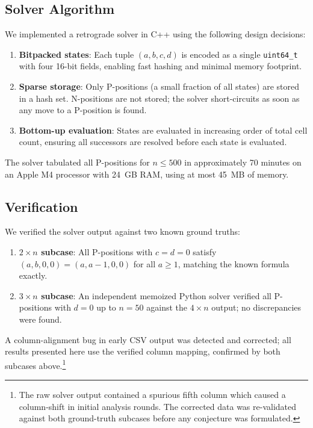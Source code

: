 \documentclass[12pt]{article}
\begin{document}
\subsection{Solver Algorithm}

We implemented a retrograde solver in C++ using the following design
decisions:
\begin{enumerate}
  \item \textbf{Bitpacked states}: Each tuple $(a,b,c,d)$ is encoded
        as a single \texttt{uint64\_t} with four 16-bit fields, enabling
        fast hashing and minimal memory footprint.
  \item \textbf{Sparse storage}: Only P-positions (a small fraction of
        all states) are stored in a hash set. N-positions are not stored;
        the solver short-circuits as soon as any move to a P-position
        is found.
  \item \textbf{Bottom-up evaluation}: States are evaluated in increasing
        order of total cell count, ensuring all successors are resolved
        before each state is evaluated.
\end{enumerate}

The solver tabulated all P-positions for $n \leq 500$ in approximately
70 minutes on an Apple M4 processor with 24~GB RAM, using at most 45~MB
of memory.

\subsection{Verification}

We verified the solver output against two known ground truths:
\begin{enumerate}
  \item \textbf{$2 \times n$ subcase}: All P-positions with $c = d = 0$
        satisfy $(a, b, 0, 0) = (a, a-1, 0, 0)$ for all $a \geq 1$,
        matching the known formula exactly.
  \item \textbf{$3 \times n$ subcase}: An independent memoized Python
        solver verified all P-positions with $d = 0$ up to $n = 50$
        against the $4 \times n$ output; no discrepancies were found.
\end{enumerate}

A column-alignment bug in early CSV output was detected and corrected;
all results presented here use the verified column mapping, confirmed by
both subcases above.\footnote{The raw solver output contained a spurious
fifth column which caused a column-shift in initial analysis rounds.
The corrected data was re-validated against both ground-truth subcases
before any conjecture was formulated.}
\end{document}
